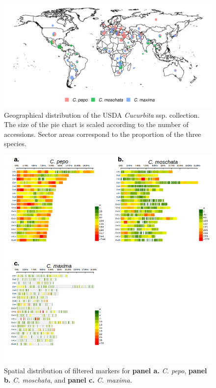 \documentclass[utf8]{FrontiersinHarvard} %
\begin{document}
\begin{figure}[h]
	\begin{center}
		\includegraphics[width=\textwidth]{../final_figures/01_fig.png}
	\end{center}
	\caption{Geographical distribution of the USDA \textit{Cucurbita} ssp. collection. The size of the pie chart is scaled according to the number of accessions. Sector areas correspond to the proportion of the three species. \label{fig:1}}
\end{figure}

\clearpage

\begin{figure}[h]
	\begin{center}
		\includegraphics[width=\textwidth]{../final_figures/02_fig.png}
	\end{center}
	\caption{Spatial distribution of filtered markers for \textbf{panel a.} \textit{C. pepo}, \textbf{panel b.} \textit{C. moschata}, and \textbf{panel c.} \textit{C. maxima.} \label{fig:2}}
\end{figure}
\end{document}
